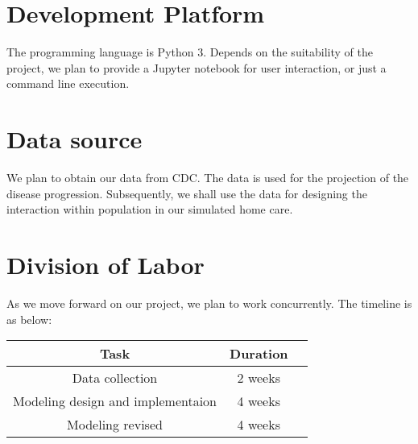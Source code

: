 \documentclass{article}
\begin{document}
\begin{normalsize}
    \section{Development Platform}
    The programming language is Python $3$. Depends on the suitability of the project, we plan to provide a Jupyter notebook for user interaction, or just a command line execution.
    
    \section{Data source}
    We plan to obtain our data from CDC. The data is used for the projection of the disease progression. Subsequently, we shall use the data for designing the interaction within population in our simulated home care. 
    
    \section{Division of Labor}
    As we move forward on our project, we plan to work concurrently. The timeline is as below:
       
    \begin{center}
    	\begin{tabular}{ |c|c|c| } 
    		\hline
    		Task & Duration  \\ 
    		\hline
    		Data collection & 2 weeks \\ 
    		Modeling design and implementaion & 4 weeks \\ 
    		Modeling revised & 4 weeks \\ 
    		\hline
    	\end{tabular}
    \end{center}
    
    
    
    
    
\end{normalsize}
  
\end{document}
